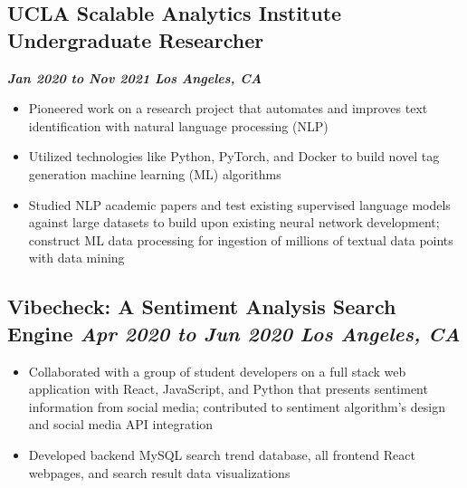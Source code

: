 \documentclass[10pt]{article}
\begin{document}
\begin{raggedright}
        \subsection*{\textbf{\large{UCLA Scalable Analytics Institute \textendash{} Undergraduate Researcher}}} \hfill \textbf{\textit{Jan 2020 to Nov 2021 \textendash{} Los Angeles, CA}}
        \begin{itemize}
            \item Pioneered work on a research project that automates and improves text identification with natural language processing (NLP)
            \item Utilized technologies like Python, PyTorch, and Docker to build novel tag generation machine learning (ML) algorithms
            \item Studied NLP academic papers and test existing supervised language models against large datasets to build upon existing neural network development; construct ML data processing for ingestion of millions of textual data points with data mining
        \end{itemize}

        \subsection*{\textbf{\large{Vibecheck: A Sentiment Analysis Search Engine}} \hfill \textbf{\textit{Apr 2020 to Jun 2020 \textendash{} Los Angeles, CA}}}
        \begin{itemize}
            \item Collaborated with a group of student developers on a full stack web application with React, JavaScript, and Python that presents sentiment information from social media; contributed to sentiment algorithm's design and social media API integration
            \item Developed backend MySQL search trend database, all frontend React webpages, and search result data visualizations
        \end{itemize}

    \end{raggedright}
\end{document}
